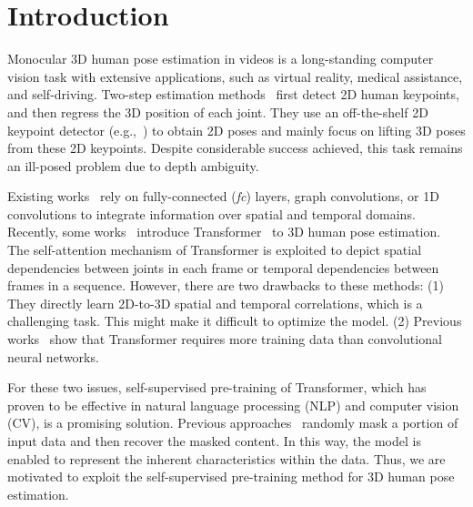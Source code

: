 \documentclass[]{llncs}
\begin{document}
\section{Introduction}

Monocular 3D human pose estimation in videos is a long-standing computer vision task with extensive applications, such as virtual reality, medical assistance, and self-driving. Two-step estimation methods~\cite{lin2019trajectory,fang2018learning,liu2020learning,li2019generating,hu2021conditional} first detect 2D human keypoints, and then regress the 3D position of each joint. They use an off-the-shelf 2D keypoint detector (e.g.,~\cite{newell2016stacked,chen2018cascaded}) to obtain 2D poses and mainly focus on lifting 3D poses from these 2D keypoints. Despite considerable success achieved, this task remains an ill-posed problem due to depth ambiguity.

Existing works~\cite{martinez2017simple,pavllo20193d,liu2020attention,chen2021anatomy,ci2019optimizing,zhao2019semantic} rely on fully-connected (\emph{fc}) layers, graph convolutions, or 1D convolutions to integrate information over spatial and temporal domains. Recently, some works~\cite{zheng20213d,lin2021end,li2022exploiting} introduce Transformer~\cite{vaswani2017attention} to 3D human pose estimation. The self-attention mechanism of Transformer is exploited to depict spatial dependencies between joints in each frame or temporal dependencies between frames in a sequence. However, there are two drawbacks to these methods: (1) They directly learn 2D-to-3D spatial and temporal correlations, which is a challenging task. This might make it difficult to optimize the model. (2) Previous works~\cite{dosovitskiy2021an} show that Transformer requires more training data than convolutional neural networks. 

For these two issues, self-supervised pre-training of Transformer, which has proven to be effective in natural language processing (NLP) and computer vision (CV), is a promising solution. Previous approaches~\cite{devlin2018bert,chen2020generative,he2022masked,bao2022beit} randomly mask a portion of input data and then recover the masked content. In this way, the model is enabled to represent the inherent characteristics within the data. Thus, we are motivated to exploit the self-supervised pre-training method for 3D human pose estimation.
\end{document}
